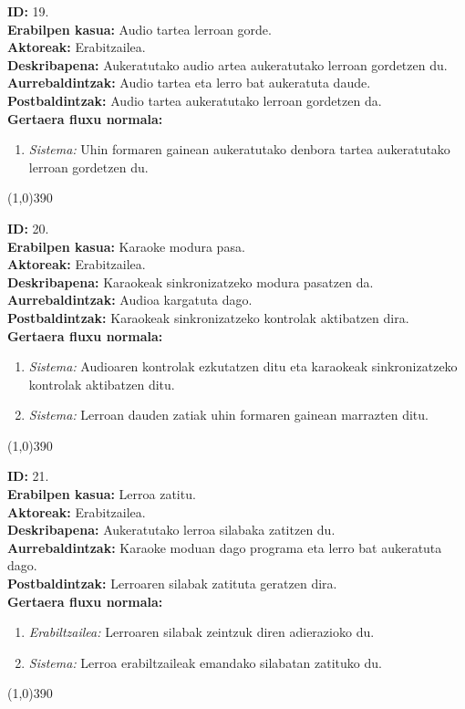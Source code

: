 \noindent
\textbf{ID:} 19.\\
\textbf{Erabilpen kasua:} Audio tartea lerroan gorde.\\
\textbf{Aktoreak:} Erabitzailea.\\
\textbf{Deskribapena:} Aukeratutako audio artea aukeratutako lerroan gordetzen du.\\
\textbf{Aurrebaldintzak:} Audio tartea eta lerro bat aukeratuta daude.\\
\textbf{Postbaldintzak:} Audio tartea aukeratutako lerroan gordetzen da.\\
\textbf{Gertaera fluxu normala:}
\begin{enumerate}
	\item \textit{Sistema:} Uhin formaren gainean aukeratutako denbora tartea aukeratutako lerroan gordetzen du.
\end{enumerate}
\line(1,0){390}

\noindent
\textbf{ID:} 20.\\
\textbf{Erabilpen kasua:} Karaoke modura pasa.\\
\textbf{Aktoreak:} Erabitzailea.\\
\textbf{Deskribapena:} Karaokeak sinkronizatzeko modura pasatzen da.\\
\textbf{Aurrebaldintzak:} Audioa kargatuta dago.\\
\textbf{Postbaldintzak:} Karaokeak sinkronizatzeko kontrolak aktibatzen dira.\\
\textbf{Gertaera fluxu normala:}
\begin{enumerate}
	\item \textit{Sistema:} Audioaren kontrolak ezkutatzen ditu eta karaokeak sinkronizatzeko kontrolak aktibatzen ditu.
	\item \textit{Sistema:} Lerroan dauden zatiak uhin formaren gainean marrazten ditu.
\end{enumerate}
\line(1,0){390}

\noindent
\textbf{ID:} 21.\\
\textbf{Erabilpen kasua:} Lerroa zatitu.\\
\textbf{Aktoreak:} Erabitzailea.\\
\textbf{Deskribapena:} Aukeratutako lerroa silabaka zatitzen du.\\
\textbf{Aurrebaldintzak:} Karaoke moduan dago programa eta lerro bat aukeratuta dago.\\
\textbf{Postbaldintzak:} Lerroaren silabak zatituta geratzen dira.\\
\textbf{Gertaera fluxu normala:}
\begin{enumerate}
	\item \textit{Erabiltzailea:} Lerroaren silabak zeintzuk diren adierazioko du.
	\item \textit{Sistema:} Lerroa erabiltzaileak emandako silabatan zatituko du.
\end{enumerate}
\line(1,0){390}

